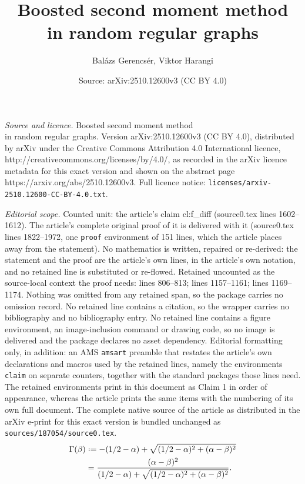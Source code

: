 \documentclass[10pt,a4paper]{amsart}
\title{Boosted second moment method\\in random regular graphs}
\author{Bal\'azs Gerencs\'er, Viktor Harangi}
\date{Source: arXiv:2510.12600v3 (CC BY 4.0)}
\newcommand\Ga{\Gamma}
\newcommand\al{\alpha}
\newcommand\be{\beta}
\newcommand{\defeq}{\mathrel{\vcenter{\baselineskip0.5ex \lineskiplimit0pt
                     \hbox{\scriptsize.}\hbox{\scriptsize.}}}%
                     =}
\begin{document}
\maketitle

\noindent\emph{Source and licence.} Boosted second moment method\\in random regular graphs. Version arXiv:2510.12600v3 (CC BY 4.0), distributed by arXiv under the Creative Commons Attribution 4.0 International licence, http://creativecommons.org/licenses/by/4.0/, as recorded in the arXiv licence metadata for this exact version and shown on the abstract page https://arxiv.org/abs/2510.12600v3. Full licence notice: \texttt{licenses/arxiv-2510.12600-CC-BY-4.0.txt}.\par\smallskip

\noindent\textit{Editorial scope.} Counted unit: the article's claim cl:f\_diff (source0.tex lines 1602--1612). The article's complete original proof of it is delivered with it (source0.tex lines 1822--1972, one \texttt{proof} environment of 151 lines, which the article places away from the statement). No mathematics is written, repaired or re-derived: the statement and the proof are the article's own lines, in the article's own notation, and no retained line is substituted or re-flowed.  Retained uncounted as the source-local context the proof needs: lines 806--813; lines 1157--1161; lines 1169--1174.  Nothing was omitted from any retained span, so the package carries no omission record.  No retained line contains a citation, so the wrapper carries no bibliography and no bibliography entry.  No retained line contains a figure environment, an image-inclusion command or drawing code, so no image is delivered and the package declares no asset dependency.  Editorial formatting only, in addition: an AMS \texttt{amsart} preamble that restates the article's own declarations and macros used by the retained lines, namely the environments \texttt{claim} on separate counters, together with the standard packages those lines need.  The retained environments print in this document as Claim 1 in order of appearance, whereas the article prints the same items with the numbering of its own full document.  The complete native source of the article as distributed in the arXiv e-print for this exact version is bundled unchanged as \texttt{sources/187054/source0.tex}.
\begin{align}
\Ga(\be) 
&\defeq -(1/2-\al)+\sqrt{(1/2-\al)^2+(\al-\be)^2} 
\label{eq:Ga_first} \\
&= \frac{(\al-\be)^2}{(1/2-\al) 
+\sqrt{(1/2-\al)^2+(\al-\be)^2}} .
\label{eq:Ga_second}
\end{align}  
\end{document}
